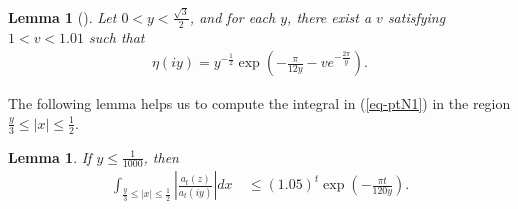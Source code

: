\documentclass[11pt]{amsart}
\theoremstyle{plain}
\newtheorem{lemma}[theorem]{Lemma}
\renewcommand{\Im}{\operatorname{Im}}
\numberwithin{equation}{section}
\begin{document}
	\begin{lemma}[{\cite[Lemma 3.4]{barman2025lower}}]\label{lemma-2.2}
		Let $0<y<\frac{\sqrt{3}}{2}$, and for each $y$, there exist a $v$ satisfying $1<v<1.01$ such that
		\begin{align*}
			\eta(iy) = y^{-\frac{1}{2}} \exp\left( -\frac{\pi}{12y} - v e^{-\frac{2\pi}{y}} \right).
		\end{align*}
	\end{lemma}	
	The following lemma helps us to compute the integral in (\ref{eq-ptN1}) in the region $\frac{y}{3} \le |x| \le \frac{1}{2}$.
	\begin{lemma}\label{proposition-error}
		If $y\le \frac{1}{1000}$, then 
		\begin{align*}
			\int_{\frac{y}{3}\le |x|\le \frac{1}{2}}\left|\frac{a_t(z)}{a_t(iy)}\right|dx\ &\le (1.05)^{t} \exp\left(-\frac{\pi t}{120y}\right).
		\end{align*}
	\end{lemma}
\end{document}
